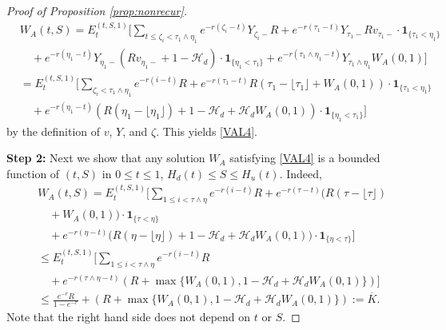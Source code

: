 \documentclass[11pt]{article}%
\numberwithin{equation}{section}
\theoremstyle{plain}
\begin{document}
\begin{appendices}
\begin{proof}[Proof of Proposition \ref{prop:nonrecur}]
	\begin{align*}
	&W_A(t,S)=E_t^{(t,S,1)}\Bigg[\sum_{t\le\zeta_i<\tau_1\land\eta_1}e^{-r(\zeta_i-t)}Y_{\zeta_i-}R+e^{-r(\tau_1-t)}Y_{\tau_1-}Rv_{\tau_1-}\cdot\mathbf{1}_{\{\tau_1<\eta_1\}}\\
	&\quad+e^{-r(\eta_1-t)}Y_{\eta_1-}(Rv_{\eta_1-}+1-\mathcal{H}_d)\cdot\mathbf{1}_{\{\eta_1<\tau_1\}}+e^{-r(\tau_1\land\eta_1-t)}Y_{\tau_1\land\eta_1}W_A(0,1)\Bigg]\\
	&=E_t^{(t,S,1)}\Bigg[\sum_{\zeta_i<\tau_1\land\eta_1}e^{-r(i-t)}R+e^{-r(\tau_1-t)}R(\tau_1-\lfloor\tau_1\rfloor+W_A(0,1))\cdot\mathbf{1}_{\{\tau_1<\eta_1\}}\\
	&\quad+e^{-r(\eta_1-t)}(R(\eta_1-\lfloor\eta_1\rfloor)+1-\mathcal{H}_d+\mathcal{H}_d W_A(0,1))\cdot\mathbf{1}_{\{\eta_1<\tau_1\}}\Bigg]
	\end{align*}
	by the definition of $v$, $Y$, and $\zeta$. This yields \eqref{VAL4}.
	
	{\flushleft\bf Step 2:} Next we show that any solution $W_A$ satisfying \eqref{VAL4} is a bounded function of $(t,S)$ in $0\le t\le 1$, $H_d(t)\le S\le H_u(t)$. Indeed,
	\begin{align*}
	&W_A(t,S)=E_t^{(t,S,1)}\Bigg[\sum_{1\le i< \tau\land\eta}e^{-r(i-t)}R+e^{-r(\tau-t)} \Bigg( R(\tau-\lfloor\tau\rfloor)  \\
	&\quad+W_A(0,1))\cdot\mathbf{1}_{\{\tau<\eta\}} \\
	&\quad   +e^{-r(\eta-t)}(R(\eta-\lfloor\eta\rfloor)+1-\mathcal{H}_d+\mathcal{H}_d W_A(0,1) \Bigg) \cdot \mathbf{1}_{\{\eta<\tau\}}\Bigg]\\
	&\le E_t^{(t,S,1)}\Bigg[\sum_{1\le i< \tau\land\eta}e^{-r(i-t)}R   \\
	&\quad +e^{-r(\tau\land\eta-t)}(R+\max\{W_A(0,1),1-\mathcal{H}_d+\mathcal{H}_d W_A(0,1)\})\Bigg]\\
	&\le \frac{e^{-r}R}{1-e^{-r}}+(R+\max\{W_A(0,1),1-\mathcal{H}_d+\mathcal{H}_d W_A(0,1)\}):=\overline{K}.
	\end{align*}
	Note that the right hand side does not depend on $t$ or $S$.
	

\end{proof}
\end{appendices}
\end{document}
